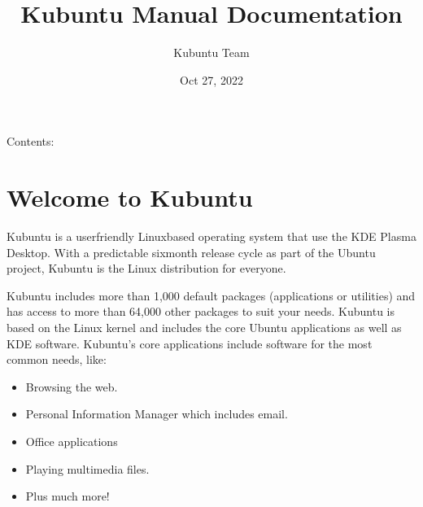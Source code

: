 \documentclass[letterpaper,10pt,english]{sphinxmanual}
\title{Kubuntu Manual Documentation}
\date{Oct 27, 2022}
\author{Kubuntu Team}
\begin{document}
\pagestyle{empty}
\sphinxmaketitle
\pagestyle{plain}
\sphinxtableofcontents
\pagestyle{normal}
\label{\detokenize{index::doc}}


\sphinxAtStartPar
Contents:


\chapter{Welcome to Kubuntu}
\label{\detokenize{welcome:welcome-to-kubuntu}}\label{\detokenize{welcome::doc}}

\sphinxAtStartPar
Kubuntu is a user\sphinxhyphen{}friendly Linux\sphinxhyphen{}based operating system that use the KDE Plasma Desktop. With a predictable
six\sphinxhyphen{}month release cycle as part of the Ubuntu project, Kubuntu is the Linux distribution for everyone.

\sphinxAtStartPar
Kubuntu includes more than 1,000 default packages (applications or utilities) and has access to more than 64,000 other packages to suit your needs. Kubuntu is based on the Linux kernel and includes the core Ubuntu applications as well as KDE software. Kubuntu’s core applications include software for the most common needs, like:
\begin{itemize}
\item {} 
\sphinxAtStartPar
Browsing the web.

\item {} 
\sphinxAtStartPar
Personal Information Manager which includes email.

\item {} 
\sphinxAtStartPar
Office applications

\item {} 
\sphinxAtStartPar
Playing multimedia files.

\item {} 
\sphinxAtStartPar
Plus much more!

\end{itemize}
\end{document}
